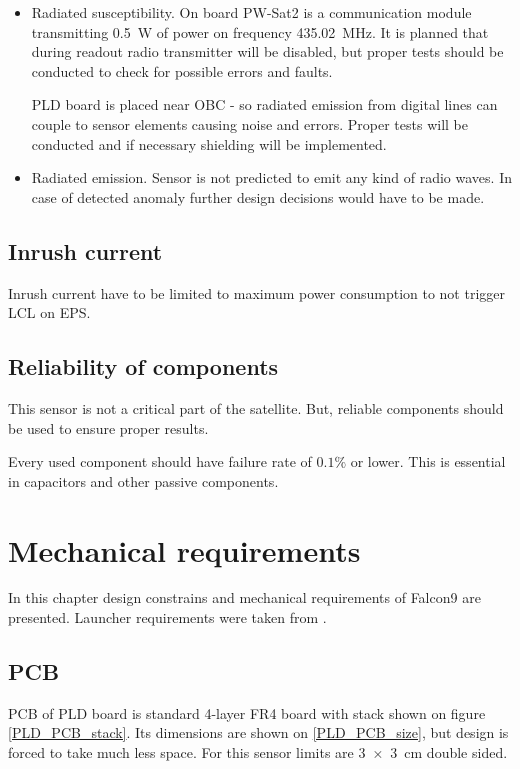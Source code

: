 \begin{itemize}
            \item Radiated susceptibility.
                On board PW-Sat2 is a communication module transmitting \SI{0.5}{\watt} of power on frequency \SI{435.02}{\mega\hertz}. It is planned that during readout radio transmitter will be disabled, but proper tests should be conducted to check for possible errors and faults.

                PLD board is placed near OBC - so radiated emission from digital lines can couple to sensor elements causing noise and errors. Proper tests will be conducted and if necessary shielding will be implemented.

            \item Radiated emission.
                Sensor is not predicted to emit any kind of radio waves. In case of detected anomaly further design decisions would have to be made.

        \end{itemize}


    \subsection{Inrush current}
        Inrush current have to be limited to maximum power consumption to not trigger LCL on EPS.

    \subsection{Reliability of components}
        This sensor is not a critical part of the satellite. But, reliable components should be used to ensure proper results.

        Every used component should have failure rate of $0.1\si{\percent}$ or lower. This is essential in capacitors and other passive components.


\section{Mechanical requirements}
    In this chapter design constrains and mechanical requirements of Falcon9 are presented. Launcher requirements were taken from \cite{Falcon9_user_manual}.

    \subsection{PCB}
    \label{PCB_description}
        PCB of PLD board is standard 4-layer FR4 board with stack shown on figure \ref{PLD_PCB_stack}. Its dimensions are shown on \ref{PLD_PCB_size}, but design is forced to take much less space. For this sensor limits are \SI{3x3}{\centi\meter} double sided.


